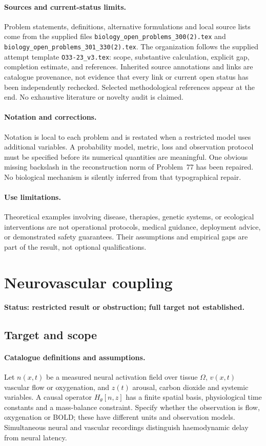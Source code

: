 \documentclass[11pt]{article}
\begin{document}
\paragraph{Sources and current-status limits.}
Problem statements, definitions, alternative formulations and local source lists
come from the supplied files
\texttt{biology\_open\_problems\_300(2).tex} and
\texttt{biology\_open\_problems\_301\_330(2).tex}.
The organization follows the supplied attempt template
\texttt{O33-23\_v3.tex}: scope, substantive calculation, explicit gap,
completion estimate, and references. Inherited source annotations and links are
catalogue provenance, not evidence that every link or current open status has
been independently rechecked. Selected methodological references appear at the
end. No exhaustive literature or novelty audit is claimed.

\paragraph{Notation and corrections.}
Notation is local to each problem and is restated when a restricted model uses
additional variables. A probability model, metric, loss and observation protocol
must be specified before its numerical quantities are meaningful. One obvious
missing backslash in the reconstruction norm of Problem~77 has been repaired.
No biological mechanism is silently inferred from that typographical repair.

\paragraph{Use limitations.}
Theoretical examples involving disease, therapies, genetic systems, or ecological
interventions are not operational protocols, medical guidance, deployment advice,
or demonstrated safety guarantees. Their assumptions and empirical gaps are part
of the result, not optional qualifications.


\section*{Neurovascular coupling}
\label{prob:120}
\noindent\textbf{Status: restricted result or obstruction; full target not established.}
\subsection{Target and scope}
\paragraph{Catalogue definitions and assumptions.}
Let $n(x,t)$ be a measured neural activation field over tissue $\Omega$, $v(x,t)$ vascular flow or oxygenation, and $z(t)$ arousal, carbon dioxide and systemic variables. A causal operator $H_\theta[n,z]$ has a finite spatial basis, physiological time constants and a mass-balance constraint. Specify whether the observation is flow, oxygenation or BOLD; these have different units and observation models. Simultaneous neural and vascular recordings distinguish haemodynamic delay from neural latency.
\end{document}
